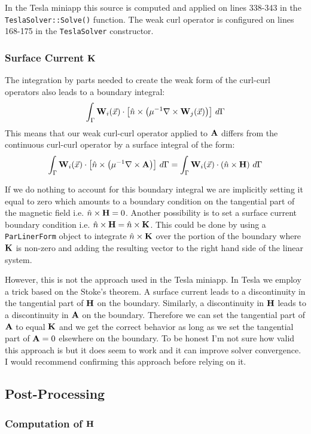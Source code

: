 \documentclass[12pt]{article}
\providecommand{\A}{\mbox{\bf A}}
\renewcommand{\H}{\mbox{\bf H}}
\providecommand{\K}{\mbox{\bf K}}
\providecommand{\W}{\mbox{\bf W}}
\providecommand{\x}{\vec{x}}
\newcommand{\Curl}{\nabla\times}
\begin{document}
In the Tesla miniapp this source is computed and applied on lines
338-343 in the {\tt TeslaSolver::Solve()} function. The weak curl
operator is configured on lines 168-175 in the {\tt TeslaSolver}
constructor.

\subsubsection{Surface Current $\K$}
\label{sec:surf_current}

The integration by parts needed to create the weak form of the
curl-curl operators also leads to a boundary integral:
\[\int_\Gamma\W_i(\x)\cdot\left[\hat{n}\times\left(\mu^{-1}\Curl\W_j(\x)\right)\right]\,d\Gamma\]
This means that our weak curl-curl operator applied to $\A$ differs
from the continuous curl-curl operator by a surface integral of the
form:
\[\int_\Gamma\W_i(\x)\cdot\left[\hat{n}\times\left(\mu^{-1}\Curl\A\right)\right]\,d\Gamma = \int_\Gamma\W_i(\x)\cdot\left(\hat{n}\times\H\right)\,d\Gamma\]

If we do nothing to account for this boundary integral we are
implicitly setting it equal to zero which amounts to a boundary
condition on the tangential part of the magnetic field
i.e. $\hat{n}\times\H=0$. Another possibility is to set a surface
current boundary condition
i.e. $\hat{n}\times\H=\hat{n}\times\K$. This could be done by using a
{\tt ParLinerForm} object to integrate $\hat{n}\times\K$ over the
portion of the boundary where $\K$ is non-zero and adding the
resulting vector to the right hand side of the linear system.

However, this is not the approach used in the Tesla miniapp. In Tesla
we employ a trick based on the Stoke's theorem. A surface current
leads to a discontinuity in the tangential part of $\H$ on the
boundary. Similarly, a discontinuity in $\H$ leads to a discontinuity
in $\A$ on the boundary. Therefore we can set the tangential part of
$\A$ to equal $\K$ and we get the correct behavior as long as we set
the tangential part of $\A=0$ elsewhere on the boundary. To be honest
I'm not sure how valid this approach is but it does seem to work and
it can improve solver convergence. I would recommend confirming this
approach before relying on it.

\subsection{Post-Processing}

\subsubsection{Computation of $\H$}
\label{sec:h_comp}
\end{document}
